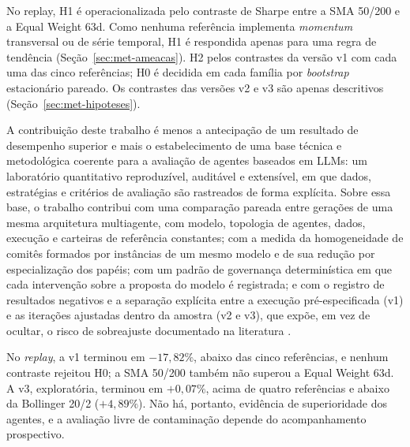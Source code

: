 No replay, H1 é operacionalizada pelo contraste de Sharpe entre a SMA 50/200 e a Equal Weight 63d. Como nenhuma referência implementa \textit{momentum} transversal ou de série temporal, H1 é respondida apenas para uma regra de tendência (Seção~\ref{sec:met-ameacas}). H2 pelos contrastes da versão v1 com cada uma das cinco referências; H0 é decidida em cada família por \textit{bootstrap} estacionário pareado. Os contrastes das versões v2 e v3 são apenas descritivos (Seção~\ref{sec:met-hipoteses}).

A contribuição deste trabalho é menos a antecipação de um resultado de desempenho superior e mais o estabelecimento de uma base técnica e metodológica coerente para a avaliação de agentes baseados em LLMs: um laboratório quantitativo reproduzível, auditável e extensível, em que dados, estratégias e critérios de avaliação são rastreados de forma explícita. Sobre essa base, o trabalho contribui com uma comparação pareada entre gerações de uma mesma arquitetura multiagente, com modelo, topologia de agentes, dados, execução e carteiras de referência constantes; com a medida da homogeneidade de comitês formados por instâncias de um mesmo modelo e de sua redução por especialização dos papéis; com um padrão de governança determinística em que cada intervenção sobre a proposta do modelo é registrada; e com o registro de resultados negativos e a separação explícita entre a execução pré-especificada (v1) e as iterações ajustadas dentro da amostra (v2 e v3), que expõe, em vez de ocultar, o risco de sobreajuste documentado na literatura \citep{White2000, Bailey2017}.

No \textit{replay}, a v1 terminou em $-17{,}82\%$, abaixo das cinco referências, e nenhum contraste rejeitou H0; a SMA 50/200 também não superou a Equal Weight 63d. A v3, exploratória, terminou em $+0{,}07\%$, acima de quatro referências e abaixo da Bollinger 20/2 ($+4{,}89\%$). Não há, portanto, evidência de superioridade dos agentes, e a avaliação livre de contaminação depende do acompanhamento prospectivo.

